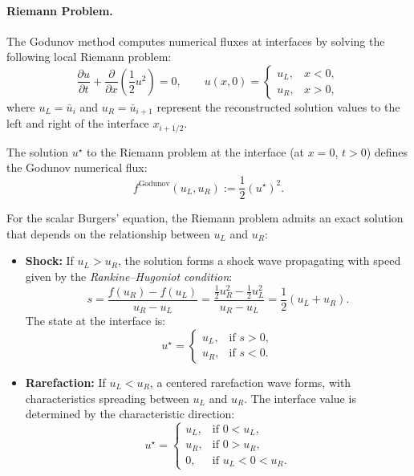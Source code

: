\paragraph{Riemann Problem.} The Godunov method computes numerical fluxes at interfaces by solving the following local Riemann problem:
\begin{equation}
\frac{\partial u}{\partial t} + \frac{\partial}{\partial x}\left( \frac{1}{2} u^2 \right) = 0,
\qquad
u(x,0) = 
\begin{cases}
u_L, & x < 0, \\
u_R, & x > 0,
\end{cases}
\label{eq:burgers_riemann}
\end{equation}
where \( u_L = \bar{u}_i \) and \( u_R = \bar{u}_{i+1} \) represent the reconstructed solution values to the left and right of the interface \( x_{i+1/2} \).

The solution \( u^\star \) to the Riemann problem at the interface (at \( x = 0 \), \( t > 0 \)) defines the Godunov numerical flux:
\begin{equation}
f^{\text{Godunov}}(u_L, u_R) := \frac{1}{2}(u^\star)^2.
\end{equation}

For the scalar Burgers' equation, the Riemann problem admits an exact solution that depends on the relationship between \( u_L \) and \( u_R \):

\begin{itemize}
    \item \textbf{Shock:} If \( u_L > u_R \), the solution forms a shock wave propagating with speed given by the \emph{Rankine--Hugoniot condition}:
    \[
    s = \frac{f(u_R) - f(u_L)}{u_R - u_L} 
    = \frac{\frac{1}{2}u_R^2 - \frac{1}{2}u_L^2}{u_R - u_L}
    = \frac{1}{2}(u_L + u_R).
    \]
    The state at the interface is:
    \[
    u^\star = 
    \begin{cases}
    u_L, & \text{if } s > 0, \\
    u_R, & \text{if } s < 0.
    \end{cases}
    \]

    \item \textbf{Rarefaction:} If \( u_L < u_R \), a centered rarefaction wave forms, with characteristics spreading between \( u_L \) and \( u_R \). The interface value is determined by the characteristic direction:
    \[
    u^\star = 
    \begin{cases}
    u_L, & \text{if } 0 < u_L, \\
    u_R, & \text{if } 0 > u_R, \\
    0,   & \text{if } u_L < 0 < u_R.
    \end{cases}
    \]
\end{itemize}

